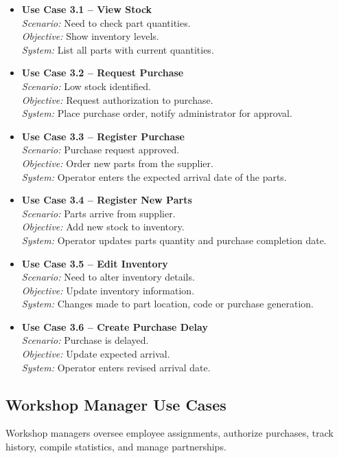 \begin{itemize}
    \item \textbf{Use Case 3.1 – View Stock}\\
    \textit{Scenario:} Need to check part quantities.\\
    \textit{Objective:} Show inventory levels.\\
    \textit{System:} List all parts with current quantities.
    \item \textbf{Use Case 3.2 – Request Purchase}\\
    \textit{Scenario:} Low stock identified.\\
    \textit{Objective:} Request authorization to purchase.\\
    \textit{System:} Place purchase order, notify administrator for approval.
    \item \textbf{Use Case 3.3 – Register Purchase}\\
    \textit{Scenario:} Purchase request approved.\\
    \textit{Objective:} Order new parts from the supplier.\\
    \textit{System:} Operator enters the expected arrival date of the parts.
    \item \textbf{Use Case 3.4 – Register New Parts}\\
    \textit{Scenario:} Parts arrive from supplier.\\
    \textit{Objective:} Add new stock to inventory.\\
    \textit{System:} Operator updates parts quantity and purchase completion date.
    \item \textbf{Use Case 3.5 – Edit Inventory}\\
    \textit{Scenario:} Need to alter inventory details.\\
    \textit{Objective:} Update inventory information.\\
    \textit{System:} Changes made to part location, code or purchase generation.
    \item \textbf{Use Case 3.6 – Create Purchase Delay}\\
    \textit{Scenario:} Purchase is delayed.\\
    \textit{Objective:} Update expected arrival.\\
    \textit{System:} Operator enters revised arrival date.
\end{itemize}

\subsection{Workshop Manager Use Cases}
Workshop managers oversee employee assignments, authorize purchases, track history, compile statistics, and manage partnerships.


